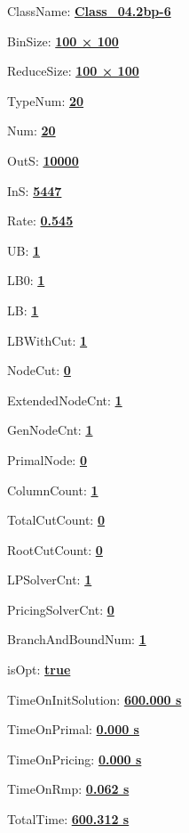 \documentclass[11pt]{article}
\begin{document}
\pagestyle{empty}


ClassName: \underline{\textbf{Class_04.2bp-6}}
\par
BinSize: \underline{\textbf{100 × 100}}
\par
ReduceSize: \underline{\textbf{100 × 100}}
\par
TypeNum: \underline{\textbf{20}}
\par
Num: \underline{\textbf{20}}
\par
OutS: \underline{\textbf{10000}}
\par
InS: \underline{\textbf{5447}}
\par
Rate: \underline{\textbf{0.545}}
\par
UB: \underline{\textbf{1}}
\par
LB0: \underline{\textbf{1}}
\par
LB: \underline{\textbf{1}}
\par
LBWithCut: \underline{\textbf{1}}
\par
NodeCut: \underline{\textbf{0}}
\par
ExtendedNodeCnt: \underline{\textbf{1}}
\par
GenNodeCnt: \underline{\textbf{1}}
\par
PrimalNode: \underline{\textbf{0}}
\par
ColumnCount: \underline{\textbf{1}}
\par
TotalCutCount: \underline{\textbf{0}}
\par
RootCutCount: \underline{\textbf{0}}
\par
LPSolverCnt: \underline{\textbf{1}}
\par
PricingSolverCnt: \underline{\textbf{0}}
\par
BranchAndBoundNum: \underline{\textbf{1}}
\par
isOpt: \underline{\textbf{true}}
\par
TimeOnInitSolution: \underline{\textbf{600.000 s}}
\par
TimeOnPrimal: \underline{\textbf{0.000 s}}
\par
TimeOnPricing: \underline{\textbf{0.000 s}}
\par
TimeOnRmp: \underline{\textbf{0.062 s}}
\par
TotalTime: \underline{\textbf{600.312 s}}
\par
\newpage
\end{document}

